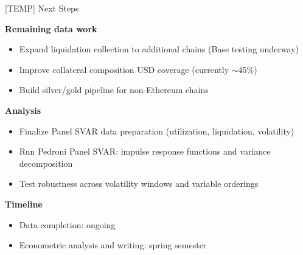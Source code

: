 \begin{frame}{[TEMP] Next Steps}

\textbf{Remaining data work}
\begin{itemize}
    \item Expand liquidation collection to additional chains (Base testing underway)
    \item Improve collateral composition USD coverage (currently $\sim$45\%)
    \item Build silver/gold pipeline for non-Ethereum chains
\end{itemize}

\vspace{0.3cm}

\textbf{Analysis}
\begin{itemize}
    \item Finalize Panel SVAR data preparation (utilization, liquidation, volatility)
    \item Run Pedroni Panel SVAR: impulse response functions and variance decomposition
    \item Test robustness across volatility windows and variable orderings
\end{itemize}

\vspace{0.3cm}

\textbf{Timeline}
\begin{itemize}
    \item Data completion: ongoing
    \item Econometric analysis and writing: spring semester
\end{itemize}

\end{frame}
